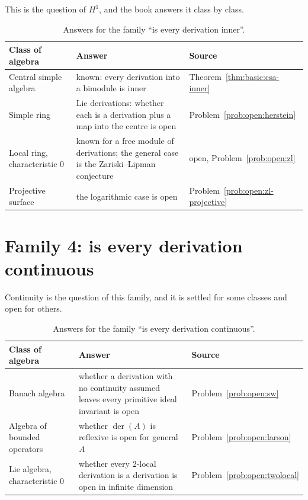 This is the question of $H^1$, and the book answers it class by class.

\begin{table}[htbp]
  \centering
  \caption{Answers for the family ``is every derivation inner''.}
  \label{tab:q:inner}
  \begin{tabular}{p{}p{}p{}}
    \toprule
    Class of algebra & Answer & Source \\
    \midrule
    Central simple algebra & known: every derivation into a bimodule is
      inner & Theorem~\ref{thm:basic:csa-inner} \\
    Simple ring & Lie derivations: whether each is a derivation plus a map
      into the centre is open & Problem~\ref{prob:open:herstein} \\
    Local ring, characteristic $0$ & known for a free module of derivations;
      the general case is the Zariski--Lipman conjecture & open,
      Problem~\ref{prob:open:zl} \\
    Projective surface & the logarithmic case is open &
      Problem~\ref{prob:open:zl-projective} \\
    \bottomrule
  \end{tabular}
\end{table}

\section{Family 4: is every derivation continuous}

Continuity is the question of this family, and it is settled for some classes
and open for others.

\begin{table}[htbp]
  \centering
  \caption{Answers for the family ``is every derivation continuous''.}
  \label{tab:q:continuity}
  \begin{tabular}{p{}p{}p{}}
    \toprule
    Class of algebra & Answer & Source \\
    \midrule
    Banach algebra & whether a derivation with no continuity assumed leaves
      every primitive ideal invariant is open & Problem~\ref{prob:open:sw} \\
    Algebra of bounded operators & whether $\operatorname{der}(A)$ is
      reflexive is open for general $A$ & Problem~\ref{prob:open:larson} \\
    Lie algebra, characteristic $0$ & whether every 2-local derivation is a
      derivation is open in infinite dimension &
      Problem~\ref{prob:open:twolocal} \\
    \bottomrule
  \end{tabular}
\end{table}

